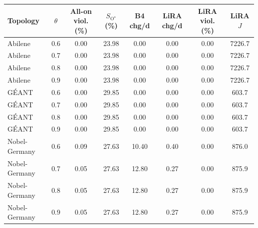 \begin{tabular}{@{}lccccccc@{}}
\toprule
Topology & $\theta$ & All-on viol. (\%) & $S_{\mathrm{O}^\star}$ (\%) & B4 chg/d & LiRA chg/d & LiRA viol. (\%) & LiRA $J$ \\
\midrule
Abilene & 0.6 & 0.00 & 23.98 & 0.00 & 0.00 & 0.00 & 7226.7 \\
Abilene & 0.7 & 0.00 & 23.98 & 0.00 & 0.00 & 0.00 & 7226.7 \\
Abilene & 0.8 & 0.00 & 23.98 & 0.00 & 0.00 & 0.00 & 7226.7 \\
Abilene & 0.9 & 0.00 & 23.98 & 0.00 & 0.00 & 0.00 & 7226.7 \\
\midrule
G\'{E}ANT & 0.6 & 0.00 & 29.85 & 0.00 & 0.00 & 0.00 & 603.7 \\
G\'{E}ANT & 0.7 & 0.00 & 29.85 & 0.00 & 0.00 & 0.00 & 603.7 \\
G\'{E}ANT & 0.8 & 0.00 & 29.85 & 0.00 & 0.00 & 0.00 & 603.7 \\
G\'{E}ANT & 0.9 & 0.00 & 29.85 & 0.00 & 0.00 & 0.00 & 603.7 \\
\midrule
Nobel-Germany & 0.6 & 0.09 & 27.63 & 10.40 & 0.40 & 0.00 & 876.0 \\
Nobel-Germany & 0.7 & 0.05 & 27.63 & 12.80 & 0.27 & 0.00 & 875.9 \\
Nobel-Germany & 0.8 & 0.05 & 27.63 & 12.80 & 0.27 & 0.00 & 875.9 \\
Nobel-Germany & 0.9 & 0.05 & 27.63 & 12.80 & 0.27 & 0.00 & 875.9 \\

\bottomrule
\end{tabular}
